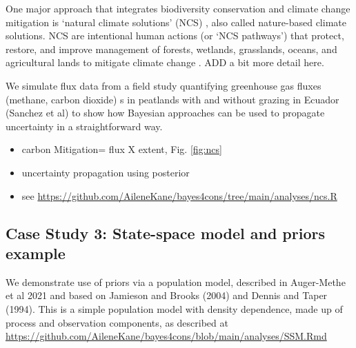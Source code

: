 \documentclass{article}
\begin{document}
\par One major approach that integrates biodiversity conservation and climate change mitigation is `natural climate solutions' (NCS) \citep{ellis2024principles}, also called nature-based climate solutions. NCS are intentional human actions (or `NCS pathways') that protect, restore, and improve management of forests, wetlands, grasslands, oceans, and agricultural lands to mitigate climate change \citep{griscom2017natural}. ADD a bit more detail here.

\par We simulate flux data from a field study quantifying greenhouse gas fluxes (methane, carbon dioxide) s in peatlands with and without grazing in Ecuador (Sanchez et al) to show how Bayesian approaches can be used to propagate uncertainty in a straightforward way. 

\begin{itemize}
\item carbon Mitigation= flux X extent, Fig. \ref{fig:ncs}
\item uncertainty propagation using posterior
\item see \href{https://github.com/AileneKane/bayes4cons/tree/main/analyses/ncs.R}{https://github.com/AileneKane/bayes4cons/tree/main/analyses/ncs.R}
\end{itemize}

\subsection*{Case Study 3: State-space model and priors example}
\par We demonstrate use of priors via a population model, described in Auger-Methe et al 2021 and based on Jamieson and Brooks (2004) and Dennis and Taper (1994). This is a simple population model with density dependence, made up of process and observation components, as described at \href{https://github.com/AileneKane/bayes4cons/blob/main/analyses/SSM.Rmd}{https://github.com/AileneKane/bayes4cons/blob/main/analyses/SSM.Rmd}
\end{document}
